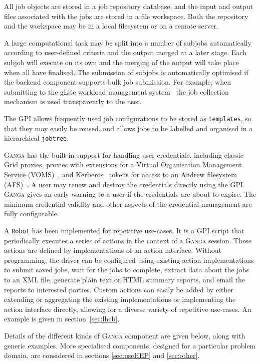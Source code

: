 \documentclass{elsart}
\def\ganga {\textsc{Ganga}\xspace}
\def\grid {Grid\xspace}
\def\GPI{GPI\xspace}
\newcommand{\code}[1]{\texttt{#1}}
\begin{document}
All job objects are stored in a job repository database, and the input
and output files associated with the jobs are stored in a file workspace. Both
the repository and the workspace may be in a local filesystem or on a remote
server.

A large computational task may be split into a number of subjobs
automatically according to user-defined criteria and the output merged
at a later stage. Each subjob will execute on its own and the merging
of the output will take place when all have finalised. The
submission of subjobs is automatically optimised if the backend
component supports bulk job submission. For example, when submitting to
the gLite workload management system~\cite{andreetto_2008} the job collection
mechanism is used transparently to the user.

The \GPI allows frequently used job configurations to be
stored as \code{templates}, so that they may easily be reused, and allows
jobs to be labelled and organised in a hierarchical \code{jobtree}.

\ganga has the built-in support for handling user credentials, including
classic \grid proxies, proxies with extensions for a Virtual Organisation Management
Service (VOMS)~\cite{VOMS}, and Kerberos~\cite{kerberos} tokens
for access to an Andrew filesystem (AFS)~\cite{AFS}. A user may renew and destroy the
credentials directly using the GPI. \ganga gives an early warning to a
user if the credentials are about to expire. The minimum credential
validity and other aspects of the credential management are fully
configurable.

A \code{Robot} has been implemented for repetitive use-cases. It is a \GPI
script that periodically executes a series of
actions in the context of a \ganga session.  These actions are defined by
implementations of an action interface.  Without programming, the driver can be
configured using existing action implementations to submit saved jobs, wait
for the jobs to complete, extract data about the jobs to an XML file, generate
plain text or HTML summary reports, and email the reports to interested
parties. Custom actions can easily be added by either extending or aggregating
the existing implementations or implementing the action interface directly,
allowing for a diverse variety of repetitive use-cases. An example is given
in section~\ref{sec:lhcb}.

Details of the different kinds of \ganga component are given below, along with
generic examples. More specialised components, designed for a particular
problem domain, are considered in sections \ref{sec:useHEP} and \ref{sec:other}.
\end{document}
